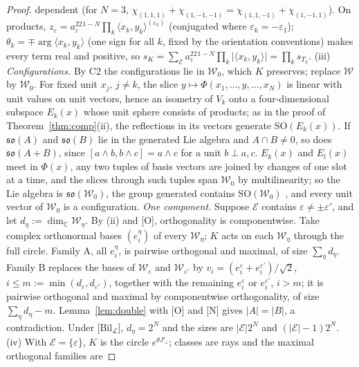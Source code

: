 \documentclass[aps,pra,onecolumn,superscriptaddress,nofootinbib,10pt]{revtex4-2}
\theoremstyle{definition}
\theoremstyle{remark}
\newcommand{\C}{\mathbb{C}}
\newcommand{\cL}{\mathcal{L}}
\newcommand{\ip}[2]{\langle #1,#2\rangle}
\newcommand{\SO}{\mathrm{SO}}
\begin{document}
\begin{proof}
dependent (for $N=3$, $\chi_{(1,1,1)}+\chi_{(1,-1,-1)}=\chi_{(1,1,-1)}+\chi_{(1,-1,1)}$).  On products,
$z_\varepsilon=a_\varepsilon^22^{1-N}\prod_k\ip{x_k}{y_k}^{(\varepsilon_k)}$ (conjugated where $\varepsilon_k=-\varepsilon_1$); $\theta_k=\mp\arg\ip{x_k}{y_k}$ (one sign for all $k$, fixed by the orientation conventions) makes
every term real and positive, so $s_K=\sum_{\mathcal E}a_\varepsilon^22^{1-N}\prod_k\lvert\ip{x_k}{y_k}\rvert=\prod_ks_{T_k}$.
(iii) \emph{Configurations.}  By C2 the configurations lie in $\mathcal W_0$, which $K$ preserves; replace $\mathcal W$ by
$\mathcal W_0$.  For fixed unit $x_j$, $j\ne k$, the slice $y\mapsto\Phi(x_1,\dots,y,\dots,x_N)$ is linear with unit values on unit
vectors, hence an isometry of $V_k$ onto a four-dimensional subspace $E_k(x)$ whose unit sphere consists of
products; as in the proof of Theorem~\ref{thm:comp}(ii), the reflections in its vectors generate
$\SO(E_k(x))$.  If $\mathfrak{so}(A)$ and $\mathfrak{so}(B)$ lie in the generated Lie algebra and $A\cap B\ne0$, so does
$\mathfrak{so}(A+B)$, since $[a\wedge b,b\wedge c]=a\wedge c$ for a unit $b\perp a,c$.  $E_k(x)$ and $E_l(x)$ meet in $\Phi(x)$, any two
tuples of basis vectors are joined by changes of one slot at a time, and the slices through such tuples
span $\mathcal W_0$ by multilinearity; so the Lie algebra is $\mathfrak{so}(\mathcal W_0)$, the group generated contains
$\SO(\mathcal W_0)$ \cite{Yamabe}, and every unit vector of $\mathcal W_0$ is a configuration.
\emph{One component.}  Suppose $\mathcal E$ contains $\varepsilon\ne\pm\varepsilon'$, and let $d_\eta:=\dim_\C\mathcal W_\eta$.  By (ii) and [O],
orthogonality is componentwise.  Take complex orthonormal bases $(e^\eta_i)$ of every $\mathcal W_\eta$; $K$ acts on each
$\mathcal W_\eta$ through the full circle.  Family A, all $e^\eta_i$, is pairwise orthogonal and maximal, of size
$\sum_\eta d_\eta$.  Family B replaces the bases of $\mathcal W_\varepsilon$ and $\mathcal W_{\varepsilon'}$ by $v_i=(e^\varepsilon_i+e^{\varepsilon'}_i)/\sqrt2$,
$i\le m:=\min(d_\varepsilon,d_{\varepsilon'})$, together with the remaining $e^\varepsilon_i$ or $e^{\varepsilon'}_i$, $i>m$; it is pairwise orthogonal
and maximal by componentwise orthogonality, of size $\sum_\eta d_\eta-m$.  Lemma~\ref{lem:double} with [O] and [N]
gives $\lvert A\rvert=\lvert B\rvert$, a contradiction.  Under [Bil$_\cL$], $d_\eta=2^N$ and the sizes are $\lvert\mathcal E\rvert2^N$ and
$(\lvert\mathcal E\rvert-1)2^N$.
(iv) With $\mathcal E=\{\varepsilon\}$, $K$ is the circle $e^{\theta J'_\varepsilon}$; classes are rays and the maximal orthogonal families are

\end{proof}
\end{document}
